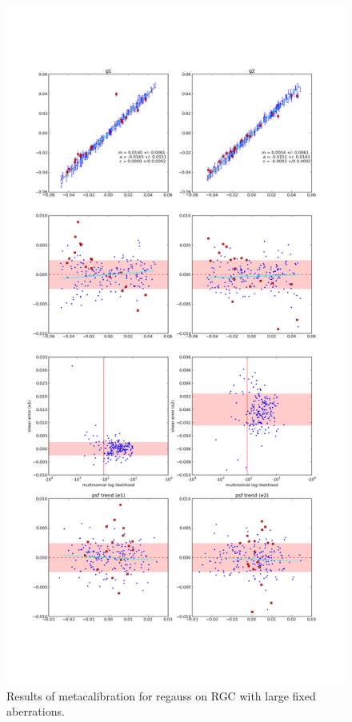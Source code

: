 \documentclass[iop]{emulateapj}
\begin{document}
\begin{figure}
\includegraphics[width=0.3\linewidth]{./Plots/rgc-fixedaber-regauss-opt-shear_plots.png}
\caption{Results of metacalibration for regauss on RGC with large fixed aberrations. }
\end{figure}
\end{document}
